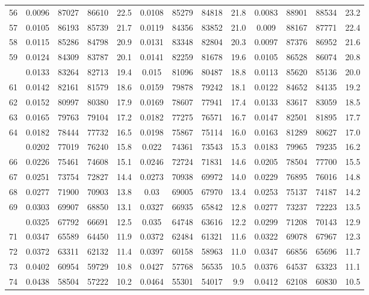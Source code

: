 \documentclass[
  14pt,
]{article}
\begin{document}
\begin{longtable}[t]{lcccccccccccc}
56 & 0.0096 & 87027 & 86610 & 22.5 & 0.0108 & 85279 & 84818 & 21.8 & 0.0083 & 88901 & 88534 & 23.2\\
57 & 0.0105 & 86193 & 85739 & 21.7 & 0.0119 & 84356 & 83852 & 21.0 & 0.009 & 88167 & 87771 & 22.4\\
58 & 0.0115 & 85286 & 84798 & 20.9 & 0.0131 & 83348 & 82804 & 20.3 & 0.0097 & 87376 & 86952 & 21.6\\
59 & 0.0124 & 84309 & 83787 & 20.1 & 0.0141 & 82259 & 81678 & 19.6 & 0.0105 & 86528 & 86074 & 20.8\\
\addlinespace
60 & 0.0133 & 83264 & 82713 & 19.4 & 0.015 & 81096 & 80487 & 18.8 & 0.0113 & 85620 & 85136 & 20.0\\
61 & 0.0142 & 82161 & 81579 & 18.6 & 0.0159 & 79878 & 79242 & 18.1 & 0.0122 & 84652 & 84135 & 19.2\\
62 & 0.0152 & 80997 & 80380 & 17.9 & 0.0169 & 78607 & 77941 & 17.4 & 0.0133 & 83617 & 83059 & 18.5\\
63 & 0.0165 & 79763 & 79104 & 17.2 & 0.0182 & 77275 & 76571 & 16.7 & 0.0147 & 82501 & 81895 & 17.7\\
64 & 0.0182 & 78444 & 77732 & 16.5 & 0.0198 & 75867 & 75114 & 16.0 & 0.0163 & 81289 & 80627 & 17.0\\
\addlinespace
65 & 0.0202 & 77019 & 76240 & 15.8 & 0.022 & 74361 & 73543 & 15.3 & 0.0183 & 79965 & 79235 & 16.2\\
66 & 0.0226 & 75461 & 74608 & 15.1 & 0.0246 & 72724 & 71831 & 14.6 & 0.0205 & 78504 & 77700 & 15.5\\
67 & 0.0251 & 73754 & 72827 & 14.4 & 0.0273 & 70938 & 69972 & 14.0 & 0.0229 & 76895 & 76016 & 14.8\\
68 & 0.0277 & 71900 & 70903 & 13.8 & 0.03 & 69005 & 67970 & 13.4 & 0.0253 & 75137 & 74187 & 14.2\\
69 & 0.0303 & 69907 & 68850 & 13.1 & 0.0327 & 66935 & 65842 & 12.8 & 0.0277 & 73237 & 72223 & 13.5\\
\addlinespace
70 & 0.0325 & 67792 & 66691 & 12.5 & 0.035 & 64748 & 63616 & 12.2 & 0.0299 & 71208 & 70143 & 12.9\\
71 & 0.0347 & 65589 & 64450 & 11.9 & 0.0372 & 62484 & 61321 & 11.6 & 0.0322 & 69078 & 67967 & 12.3\\
72 & 0.0372 & 63311 & 62132 & 11.4 & 0.0397 & 60158 & 58963 & 11.0 & 0.0347 & 66856 & 65696 & 11.7\\
73 & 0.0402 & 60954 & 59729 & 10.8 & 0.0427 & 57768 & 56535 & 10.5 & 0.0376 & 64537 & 63323 & 11.1\\
74 & 0.0438 & 58504 & 57222 & 10.2 & 0.0464 & 55301 & 54017 & 9.9 & 0.0412 & 62108 & 60830 & 10.5\\

\end{longtable}
\end{document}
